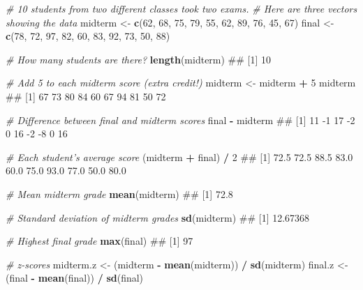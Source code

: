 \documentclass[]{book}
\newenvironment{Shaded}{\begin{snugshade}}{\end{snugshade}}
\newcommand{\KeywordTok}[1]{\textcolor[rgb]{0.13,0.29,0.53}{\textbf{#1}}}
\newcommand{\DecValTok}[1]{\textcolor[rgb]{0.00,0.00,0.81}{#1}}
\newcommand{\StringTok}[1]{\textcolor[rgb]{0.31,0.60,0.02}{#1}}
\newcommand{\CommentTok}[1]{\textcolor[rgb]{0.56,0.35,0.01}{\textit{#1}}}
\newcommand{\OperatorTok}[1]{\textcolor[rgb]{0.81,0.36,0.00}{\textbf{#1}}}
\newcommand{\NormalTok}[1]{#1}
\theoremstyle{definition}
\theoremstyle{definition}
\theoremstyle{remark}
\begin{document}
\begin{Shaded}
\begin{Highlighting}[]
\CommentTok{# 10 students from two different classes took two exams.}
\CommentTok{#  Here are three vectors showing the data}
\NormalTok{midterm <-}\StringTok{ }\KeywordTok{c}\NormalTok{(}\DecValTok{62}\NormalTok{, }\DecValTok{68}\NormalTok{, }\DecValTok{75}\NormalTok{, }\DecValTok{79}\NormalTok{, }\DecValTok{55}\NormalTok{, }\DecValTok{62}\NormalTok{, }\DecValTok{89}\NormalTok{, }\DecValTok{76}\NormalTok{, }\DecValTok{45}\NormalTok{, }\DecValTok{67}\NormalTok{)}
\NormalTok{final <-}\StringTok{ }\KeywordTok{c}\NormalTok{(}\DecValTok{78}\NormalTok{, }\DecValTok{72}\NormalTok{, }\DecValTok{97}\NormalTok{, }\DecValTok{82}\NormalTok{, }\DecValTok{60}\NormalTok{, }\DecValTok{83}\NormalTok{, }\DecValTok{92}\NormalTok{, }\DecValTok{73}\NormalTok{, }\DecValTok{50}\NormalTok{, }\DecValTok{88}\NormalTok{)}

\CommentTok{# How many students are there?}
\KeywordTok{length}\NormalTok{(midterm)}
\NormalTok{## [1] 10}

\CommentTok{# Add 5 to each midterm score (extra credit!)}
\NormalTok{midterm <-}\StringTok{ }\NormalTok{midterm }\OperatorTok{+}\StringTok{ }\DecValTok{5}
\NormalTok{midterm}
\NormalTok{##  [1] 67 73 80 84 60 67 94 81 50 72}

\CommentTok{# Difference between final and midterm scores}
\NormalTok{final }\OperatorTok{-}\StringTok{ }\NormalTok{midterm}
\NormalTok{##  [1] 11 -1 17 -2  0 16 -2 -8  0 16}

\CommentTok{# Each student's average score}
\NormalTok{(midterm }\OperatorTok{+}\StringTok{ }\NormalTok{final) }\OperatorTok{/}\StringTok{ }\DecValTok{2}
\NormalTok{##  [1] 72.5 72.5 88.5 83.0 60.0 75.0 93.0 77.0 50.0 80.0}

\CommentTok{# Mean midterm grade}
\KeywordTok{mean}\NormalTok{(midterm)}
\NormalTok{## [1] 72.8}

\CommentTok{# Standard deviation of midterm grades}
\KeywordTok{sd}\NormalTok{(midterm)}
\NormalTok{## [1] 12.67368}

\CommentTok{# Highest final grade}
\KeywordTok{max}\NormalTok{(final)}
\NormalTok{## [1] 97}

\CommentTok{# z-scores}
\NormalTok{midterm.z <-}\StringTok{ }\NormalTok{(midterm }\OperatorTok{-}\StringTok{ }\KeywordTok{mean}\NormalTok{(midterm)) }\OperatorTok{/}\StringTok{ }\KeywordTok{sd}\NormalTok{(midterm)}
\NormalTok{final.z <-}\StringTok{ }\NormalTok{(final }\OperatorTok{-}\StringTok{ }\KeywordTok{mean}\NormalTok{(final)) }\OperatorTok{/}\StringTok{ }\KeywordTok{sd}\NormalTok{(final)}
\end{Highlighting}
\end{Shaded}
\end{document}
